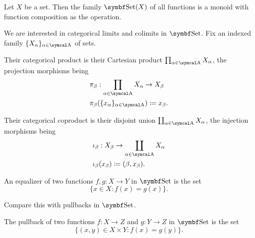 \begin{corollary}\label{thm:functions_over_set_form_monoid}
  Let \( X \) be a set. Then the family \( \Cat{Set}(X) \) of all functions is a monoid with function composition as the operation.
\end{corollary}

\begin{proposition}\label{thm:set_categorical_limits}
  We are interested in categorical limits and colimits in \( \Cat{Set} \). Fix an indexed family \( \{ X_\al \}_{\al \in \CA} \) of sets.
  \begin{defenum}
     Their categorical product is their Cartesian product \( \prod_{\al \in \CA} X_\al \), the projection morphisms being
    \begin{align*}
      &\pi_\beta: \prod_{\al \in \CA} X_\al \to X_\beta \\
      &\pi_\beta(\{ x_\al \}_{\al \in \CA}) \coloneqq x_\beta.
    \end{align*}

     Their categorical coproduct is their disjoint union \( \coprod_{\al \in \CA} X_\al \), the injection morphisms being
    \begin{align*}
      &\iota_\beta: X_\beta \to \coprod_{\al \in \CA} X_\al \\
      &\iota_\beta(x_\beta) \coloneqq (\beta, x_\beta).
    \end{align*}

     An equalizer of two functions \( f, g: X \to Y \) in \( \Cat{Set} \) is the set
    \begin{equation*}
      \{ x \in X \colon f(x) = g(x) \}.
    \end{equation*}

    Compare this with pullbacks in \( \Cat{Set} \).

     The pullback of two functions \( f: X \to Z \) and \( g: Y \to Z \) in \( \Cat{Set} \) is the set
    \begin{equation*}
      \{ (x, y) \in X \times Y \colon f(x) = g(y) \}.
    \end{equation*}


\end{defenum}
\end{proposition}
